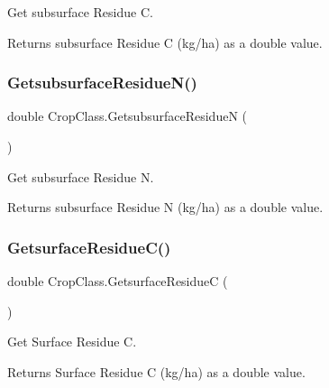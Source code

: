 Get subsurface Residue C. 

\begin{DoxyReturn}{Returns}
subsurface Residue C (kg/ha) as a double value. 
\end{DoxyReturn}
\mbox{\label{class_crop_class_a5d4011116dc6a849e041a8fa6fb0a84b}} 
\subsubsection{\texorpdfstring{GetsubsurfaceResidueN()}{GetsubsurfaceResidueN()}}
{\footnotesize\ttfamily double Crop\+Class.\+Getsubsurface\+ResidueN (\begin{DoxyParamCaption}{ }\end{DoxyParamCaption})\hspace{0.3cm}{\ttfamily [inline]}}



Get subsurface Residue N. 

\begin{DoxyReturn}{Returns}
subsurface Residue N (kg/ha) as a double value. 
\end{DoxyReturn}
\mbox{\label{class_crop_class_adb323588ad9c0b3d83af2192892d41df}} 
\subsubsection{\texorpdfstring{GetsurfaceResidueC()}{GetsurfaceResidueC()}}
{\footnotesize\ttfamily double Crop\+Class.\+Getsurface\+ResidueC (\begin{DoxyParamCaption}{ }\end{DoxyParamCaption})\hspace{0.3cm}{\ttfamily [inline]}}



Get Surface Residue C. 

\begin{DoxyReturn}{Returns}
Surface Residue C (kg/ha) as a double value. 
\end{DoxyReturn}
\mbox{\label{class_crop_class_a356b34eb080b9625637b13b21b9aa3b4}} 
